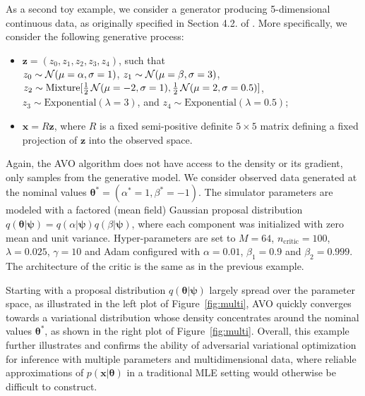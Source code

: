 \documentclass[twocolumn,superscriptaddress,aps]{revtex4-1}
\newcommand{\bftheta}{{\bm \theta}}
\newcommand{\bfpsi}{{\bm \psi}}
\newcommand{\bfz}{\mathbf{z}}
\theoremstyle{plain}
\begin{document}
As a second toy example, we consider a generator producing
5-dimensional continuous data, as originally specified in Section 4.2. of
\citep{cranmer2015approximating}. More specifically, we consider the following
generative process:
\begin{itemize}
    \item $\bfz = (z_0, z_1, z_2, z_3, z_4)$, such that \\
        $z_0 \sim {\cal N}(\mu=\alpha, \sigma=1)$,
        $z_1 \sim {\cal N}(\mu=\beta, \sigma=3)$,
        $z_2 \sim {\text{Mixture}}[\frac{1}{2}\,{\cal N}(\mu=-2, \sigma=1), \\  \frac{1}{2}\,{\cal N}(\mu=2, \sigma=0.5)]$,
        $z_3 \sim {\text{Exponential}(\lambda=3)}$, and
        $z_4 \sim {\text{Exponential}(\lambda=0.5)}$;
    \item $\mathbf{x} = R  \bfz$, where $R$ is a fixed
    semi-positive definite $5 \times 5$ matrix defining a fixed projection
    of $\bfz$ into the observed space.
\end{itemize}
Again, the AVO algorithm does not have access to the density or its gradient, only samples from the generative model.
We consider observed data generated at the nominal values $\bftheta^* = (\alpha^*=1,\beta^*=-1)$.
The simulator parameters are modeled with a factored  (mean field) Gaussian
proposal distribution $q(\bftheta|\bfpsi) = q(\alpha|\bfpsi) q(\beta|\bfpsi)$, where each component was
initialized with zero mean and unit variance.
Hyper-parameters are set to $M=64$, $n_\text{critic}=100$, $\lambda=0.025$, $\gamma=10$ and
Adam configured with $\alpha=0.01$, $\beta_1=0.9$ and $\beta_2=0.999$.
The architecture of the critic is the same as in the previous example.


Starting with a proposal distribution $q(\bftheta|\bfpsi)$ largely spread over
the parameter space, as illustrated in the left plot of Figure~\ref{fig:multi},
AVO quickly converges towards a variational distribution whose density
concentrates around the nominal values $\bftheta^*$, as shown in the right plot of Figure~\ref{fig:multi}.
Overall, this example further illustrates and confirms the ability of adversarial
variational optimization for inference with multiple parameters and multidimensional
data, where reliable approximations of $p(\mathbf{x}|\bftheta)$ in a traditional
MLE setting would otherwise be difficult to construct.
\end{document}
